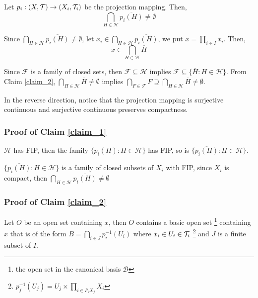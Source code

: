 \documentclass{article}
\begin{document}
\begin{claim}
    \label{claim_1}
    Let $p_i: (X, \mathcal{T}) \to (X_i, \mathcal{T}_i)$ be the projection mapping. Then,
    $$
        \bigcap_{H \in \mathcal{H}} \overline{p_i(H)} \neq \emptyset
    $$
\end{claim}

\begin{claim}
    \label{claim_2}
    Since $\bigcap_{H \in \mathcal{H}} \overline{p_i(H)} \neq \emptyset$, let $x_i \in \bigcap_{H \in \mathcal{H}}  \overline{p_i(H)}$, we put $x = \prod_{i \in I} x_i$. Then,
    $$
        x \in \bigcap_{H \in \mathcal{H}} \overline{H}
    $$
\end{claim}

Since $\mathcal{F}$ is a family of closed sets, then $\mathcal{F} \subseteq \mathcal{H}$ implies $\mathcal{F} \subseteq \{ \overline{H}: H \in \mathcal{H} \}$. From Claim \ref{claim_2}, $\bigcap_{H \in \mathcal{H}} \overline{H} \neq \emptyset$ implies $\bigcap_{F \in \mathcal{F}} F \supseteq \bigcap_{H \in \mathcal{H}} \overline{H} \neq \emptyset$.

In the reverse direction, notice that the projection mapping is surjective continuous and surjective continuous preserves compactness.



\subsubsection*{Proof of Claim \ref{claim_1}}

$\mathcal{H}$ has FIP, then the family $\{p_i(H): H \in \mathcal{H}\}$ has FIP, so is $\{\overline{p_i(H)}: H \in \mathcal{H}\}$.

$\{\overline{p_i(H)}: H \in \mathcal{H}\}$ is a family of closed subsets of $X_i$ with FIP, since $X_i$ is compact, then $\bigcap_{H \in \mathcal{H}} \overline{p_i(H)} \neq \emptyset$



\subsubsection*{Proof of Claim \ref{claim_2}}
Let $O$ be an open set containing $x$, then $O$ contains a basic open set \footnote{the open set in the canonical basis $\mathcal{B}$} containing $x$ that is of the form $B = \bigcap_{i \in J} p_i^{-1}(U_i)$ where $x_i \in U_i \in \mathcal{T}_i$ \footnote{$p_j^{-1}(U_j) = U_j \times \prod_{i \in I \setminus X_j} X_i$} and $J$ is a finite subset of $I$.
\end{document}
